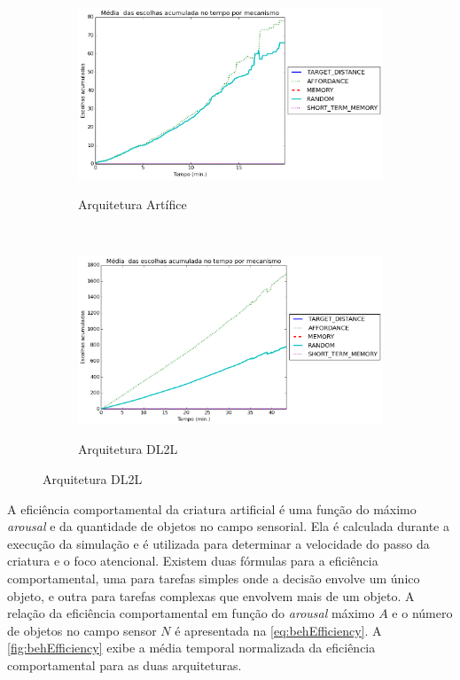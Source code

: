 \begin{figure}[h!]
    \centering
    \caption{Gráficos da média de escolhas acumuladas no tempo para a arquitetura Artífice e DL2L}
    \begin{subfigure}[b]{1.0\textwidth}
        \caption{Arquitetura Artífice}
        \includegraphics[width=\textwidth]{04-figuras/experiments/exp_1_artifice/accumulatedChoices.png}
        \label{fig:accChoices_artifice}
    \end{subfigure}
    ~
    \begin{subfigure}[b]{1.0\textwidth}
        \caption{Arquitetura DL2L}
        \includegraphics[width=\textwidth]{04-figuras/experiments/exp_1_l2l/accumulatedChoices.png}
        \label{fig:accChoices_dl2l}
    \end{subfigure}
  \label{fig:accChoices}
\end{figure}

A eficiência comportamental da criatura artificial é uma função do máximo \textit{arousal} e da quantidade de objetos no campo sensorial. Ela é calculada durante a execução da simulação e é utilizada para determinar a velocidade do passo da criatura e o foco atencional. Existem duas fórmulas para a eficiência comportamental, uma para tarefas simples onde a decisão envolve um único objeto, e outra para tarefas complexas que envolvem mais de um objeto. A relação da eficiência comportamental em função do \textit{arousal} máximo $A$ e o número de objetos no campo sensor $N$ é apresentada na \autoref{eq:behEfficiency}. A \autoref{fig:behEfficiency} exibe a média temporal normalizada da eficiência comportamental para as duas arquiteturas.

